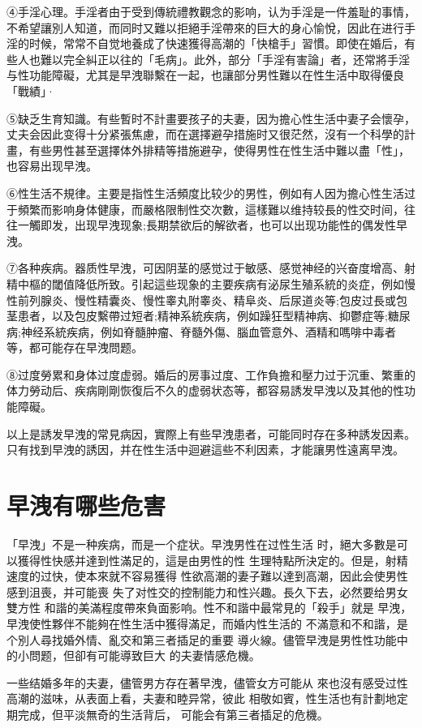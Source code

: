 \documentclass[12pt,UTF8]{ctexbook}
\begin{document}
④手淫心理。手淫者由于受到傳統禮教觀念的影响，认为手淫是一件羞耻的事情，不希望讓別人知道，而同时又難以拒絕手淫帶來的巨大的身心愉悅，因此在进行手淫的时候，常常不自觉地養成了快速獲得高潮的「快槍手」習慣。即使在婚后，有些人也難以完全糾正以往的「毛病」。此外，部分「手淫有害論」者，还常將手淫与性功能障礙，尤其是早洩聯繫在一起，也讓部分男性難以在性生活中取得優良「戰績」·

⑤缺乏生育知識。有些暫时不計畫要孩子的夫妻，因为擔心性生活中妻子会懷孕，丈夫会因此变得十分紧張焦慮，而在選擇避孕措施时又很茫然，沒有一个科學的計畫，有些男性甚至選擇体外排精等措施避孕，使得男性在性生活中難以盡「性」，也容易出现早洩。

⑥性生活不規律。主要是指性生活頻度比较少的男性，例如有人因为擔心性生活过于頻繁而影响身体健康，而嚴格限制性交次數，這樣難以维持较長的性交时间，往往一觸即发，出现早洩现象;長期禁欲后的解欲者，也可以出现功能性的偶发性早洩。

⑦各种疾病。器质性早洩，可因阴茎的感觉过于敏感、感觉神经的兴奋度增高、射精中樞的閾值降低所致。引起這些现象的主要疾病有泌尿生殖系統的炎症，例如慢性前列腺炎、慢性精囊炎、慢性睾丸附睾炎、精阜炎、后尿道炎等;包皮过長或包茎患者，以及包皮繫帶过短者;精神系統疾病，例如躁狂型精神病、抑鬱症等;糖尿病;神经系統疾病，例如脊髓肿瘤、脊髓外傷、腦血管意外、酒精和嗎啡中毒者等，都可能存在早洩問题。

⑧过度勞累和身体过度虚弱。婚后的房事过度、工作負擔和壓力过于沉重、繁重的体力勞动后、疾病剛剛恢復后不久的虚弱状态等，都容易誘发早洩以及其他的性功能障礙。

以上是誘发早洩的常見病因，實際上有些早洩患者，可能同时存在多种誘发因素。只有找到早洩的誘因，并在性生活中迴避這些不利因素，才能讓男性遠离早洩。

\section{早洩有哪些危害}

「早洩」不是一种疾病，而是一个症状。早洩男性在过性生活
时，絕大多數是可以獲得性快感并達到性滿足的，這是由男性的性
生理特點所決定的。但是，射精速度的过快，使本來就不容易獲得
性欲高潮的妻子難以達到高潮，因此会使男性感到沮喪，并可能喪
失了对性交的控制能力和性兴趣。長久下去，必然要给男女雙方性
和諧的美滿程度帶來負面影响。性不和諧中最常見的「殺手」就是
早洩，早洩使性夥伴不能夠在性生活中獲得滿足，而婚内性生活的
不滿意和不和諧，是个別人尋找婚外情、亂交和第三者插足的重要
導火線。儘管早洩是男性性功能中的小問题，但卻有可能導致巨大
的夫妻情感危機。

一些结婚多年的夫妻，儘管男方存在著早洩，儘管女方可能从
來也沒有感受过性高潮的滋味，从表面上看，夫妻和睦异常，彼此
相敬如賓，性生活也有計劃地定期完成，但平淡無奇的生活背后，
可能会有第三者插足的危機。
\end{document}
